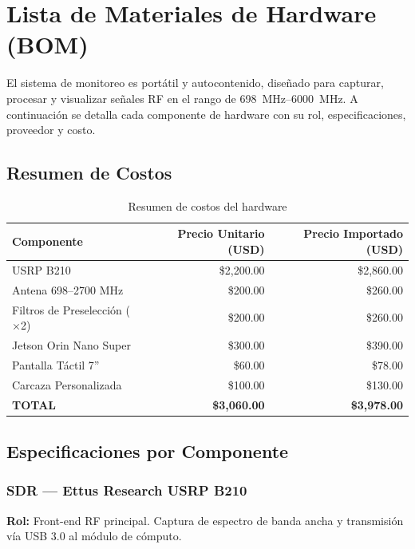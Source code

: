 \documentclass[12pt,a4paper]{article}
\begin{document}
\section{Lista de Materiales de Hardware (BOM)}

El sistema de monitoreo es portátil y autocontenido, diseñado para capturar, procesar y visualizar señales RF en el rango de \qtyrange{698}{6000}{\MHz}. A continuación se detalla cada componente de hardware con su rol, especificaciones, proveedor y costo.

\subsection{Resumen de Costos}

\begin{table}[H]
\centering
\caption{Resumen de costos del hardware}
\label{tab:cost}
\begin{tabular}{@{}lrr@{}}
\toprule
\textbf{Componente} & \textbf{Precio Unitario (USD)} & \textbf{Precio Importado (USD)} \\
\midrule
USRP B210 & \$2,200.00 & \$2,860.00 \\
Antena 698--2700 MHz & \$200.00   & \$260.00   \\
Filtros de Preselección ($\times$2) & \$200.00   & \$260.00   \\
Jetson Orin Nano Super & \$300.00   & \$390.00   \\
Pantalla Táctil 7'' & \$60.00    & \$78.00    \\
Carcaza Personalizada & \$100.00   & \$130.00   \\
\midrule
\textbf{TOTAL} & \textbf{\$3,060.00} & \textbf{\$3,978.00} \\
\bottomrule
\end{tabular}
\end{table}

\subsection{Especificaciones por Componente}

\subsubsection{SDR --- Ettus Research USRP B210}

\textbf{Rol:} Front-end RF principal. Captura de espectro de banda ancha y transmisión vía USB 3.0 al módulo de cómputo.
\end{document}
